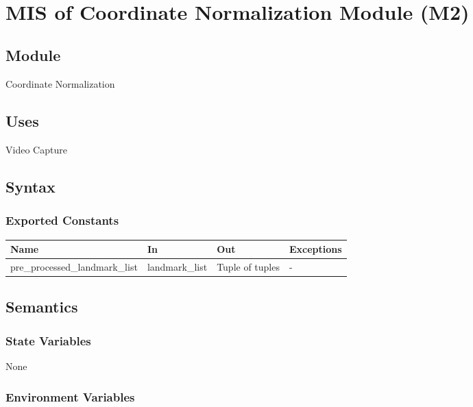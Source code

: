 \documentclass[12pt, titlepage]{article}
\begin{document}
~\newpage

\section{MIS of Coordinate Normalization Module (M2)} \label{m2}

\subsection{Module}

Coordinate Normalization

\subsection{Uses}

Video Capture

\subsection{Syntax}

\subsubsection{Exported Constants}

\begin{center}
\begin{tabular}{p{5cm} p{4cm} p{4cm} p{2cm}}
\hline
\textbf{Name} & \textbf{In} & \textbf{Out} & \textbf{Exceptions} \\
\hline
pre\_processed\_landmark\_list & landmark\_list & Tuple of tuples & - \\
\hline
\end{tabular}
\end{center}

\subsection{Semantics}

\subsubsection{State Variables}

None

\subsubsection{Environment Variables}
\end{document}

